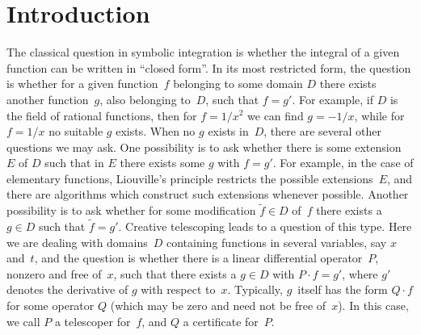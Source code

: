 \documentclass{sig-alternate}
\begin{document}
\section{Introduction}\label{SECT:intro}

The classical question in symbolic integration is whether the integral of
a given function can be written in ``closed form''. In its most restricted form,
the question is whether for a given function~$f$ belonging to some domain $D$
there exists another function~$g$, also belonging to~$D$, such that $f=g'$. For
example, if $D$ is the field of rational functions, then for $f=1/x^2$ we can
find $g=-1/x$, while for $f=1/x$ no suitable $g$ exists. When no $g$ exists
in~$D$, there are several other questions we may ask. One possibility is to ask
whether there is some extension~$E$ of $D$ such that in $E$ there exists some
$g$ with $f=g'$. For example, in the case of elementary functions, Liouville's
principle restricts the possible extensions~$E$, and there are algorithms
which construct such extensions whenever possible. Another possibility is
to ask whether for some modification $\tilde f\in D$ of~$f$ there exists a $g\in
D$ such that $\tilde f=g'$. Creative telescoping leads to a question of this
type. Here we are dealing with domains~$D$ containing functions in several
variables, say $x$ and~$t$, and the question is whether there is a linear
differential operator~$P$, nonzero and free of~$x$, such that there exists a
$g\in D$ with $P\cdot f=g'$, where $g'$ denotes the derivative of $g$ with
respect to~$x$. Typically, $g$~itself has the form $Q\cdot f$ for some operator
$Q$ (which may be zero and need not be free of~$x$). In this case, we call $P$
a telescoper for~$f$, and $Q$ a certificate for~$P$.
\end{document}
